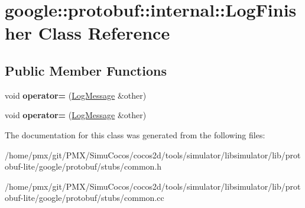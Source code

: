 \hypertarget{classgoogle_1_1protobuf_1_1internal_1_1LogFinisher}{}\section{google\+:\+:protobuf\+:\+:internal\+:\+:Log\+Finisher Class Reference}
\label{classgoogle_1_1protobuf_1_1internal_1_1LogFinisher}
\subsection*{Public Member Functions}
\begin{DoxyCompactItemize}
\item 
\mbox{\label{classgoogle_1_1protobuf_1_1internal_1_1LogFinisher_a804ace7046142749e14be0b138c5e3f6}} 
void {\bfseries operator=} (\hyperlink{classgoogle_1_1protobuf_1_1internal_1_1LogMessage}{Log\+Message} \&other)
\item 
\mbox{\label{classgoogle_1_1protobuf_1_1internal_1_1LogFinisher_a804ace7046142749e14be0b138c5e3f6}} 
void {\bfseries operator=} (\hyperlink{classgoogle_1_1protobuf_1_1internal_1_1LogMessage}{Log\+Message} \&other)
\end{DoxyCompactItemize}


The documentation for this class was generated from the following files\+:\begin{DoxyCompactItemize}
\item 
/home/pmx/git/\+P\+M\+X/\+Simu\+Cocos/cocos2d/tools/simulator/libsimulator/lib/protobuf-\/lite/google/protobuf/stubs/common.\+h\item 
/home/pmx/git/\+P\+M\+X/\+Simu\+Cocos/cocos2d/tools/simulator/libsimulator/lib/protobuf-\/lite/google/protobuf/stubs/common.\+cc\end{DoxyCompactItemize}
